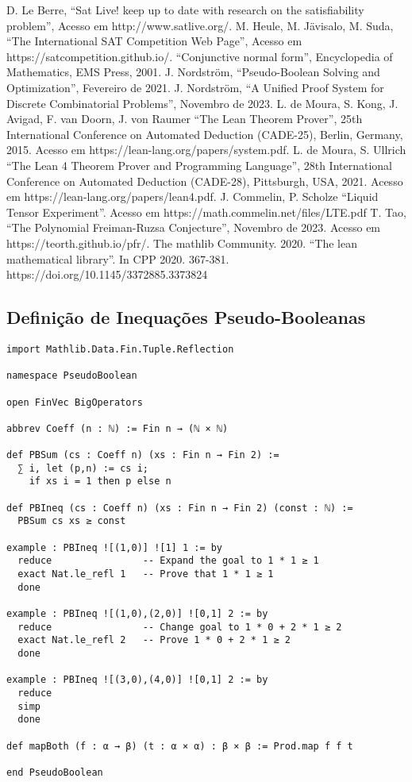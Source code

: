 \documentclass[conference]{IEEEtran}
\begin{document}
\begin{thebibliography}{00}
           D. Le Berre, ``Sat Live! keep up to date with research on the satisfiability problem'', Acesso em http://www.satlive.org/.
           M. Heule, M. Jävisalo, M. Suda, ``The International SAT Competition Web Page'', Acesso em https://satcompetition.github.io/.
               ``Conjunctive normal form'', Encyclopedia of Mathematics, EMS Press, 2001.
           J. Nordström, ``Pseudo-Boolean Solving and Optimization'', Fevereiro de 2021.
          J. Nordström, ``A Unified Proof System for Discrete Combinatorial Problems'', Novembro de 2023.
        L. de Moura, S. Kong, J. Avigad, F. van Doorn, J. von Raumer ``The Lean Theorem Prover'', 25th International Conference on Automated Deduction (CADE-25), Berlin, Germany, 2015. Acesso em https://lean-lang.org/papers/system.pdf.
             L. de Moura, S. Ullrich ``The Lean 4 Theorem Prover and Programming Language'', 28th International Conference on Automated Deduction (CADE-28), Pittsburgh, USA, 2021. Acesso em https://lean-lang.org/papers/lean4.pdf.
               J. Commelin, P. Scholze ``Liquid Tensor Experiment''. Acesso em https://math.commelin.net/files/LTE.pdf
               T. Tao, ``The Polynomial Freiman-Ruzsa Conjecture'', Novembro de 2023. Acesso em https://teorth.github.io/pfr/.
          The mathlib Community. 2020. ``The lean mathematical library''. In CPP 2020. 367-381. https://doi.org/10.1145/3372885.3373824
\end{thebibliography}

\newpage
\onecolumn
\appendix

\subsection{Definição de Inequações Pseudo-Booleanas}
\begin{verbatim}
import Mathlib.Data.Fin.Tuple.Reflection

namespace PseudoBoolean

open FinVec BigOperators

abbrev Coeff (n : ℕ) := Fin n → (ℕ × ℕ)

def PBSum (cs : Coeff n) (xs : Fin n → Fin 2) :=
  ∑ i, let (p,n) := cs i;
    if xs i = 1 then p else n

def PBIneq (cs : Coeff n) (xs : Fin n → Fin 2) (const : ℕ) :=
  PBSum cs xs ≥ const

example : PBIneq ![(1,0)] ![1] 1 := by
  reduce                -- Expand the goal to 1 * 1 ≥ 1
  exact Nat.le_refl 1   -- Prove that 1 * 1 ≥ 1
  done

example : PBIneq ![(1,0),(2,0)] ![0,1] 2 := by
  reduce                -- Change goal to 1 * 0 + 2 * 1 ≥ 2
  exact Nat.le_refl 2   -- Prove 1 * 0 + 2 * 1 ≥ 2
  done

example : PBIneq ![(3,0),(4,0)] ![0,1] 2 := by
  reduce
  simp
  done

def mapBoth (f : α → β) (t : α × α) : β × β := Prod.map f f t

end PseudoBoolean
\end{verbatim}
\newpage
\end{document}
